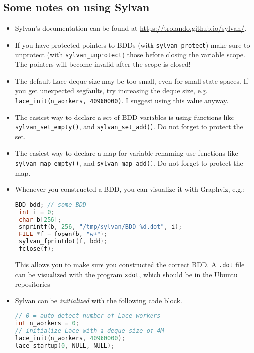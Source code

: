 \documentclass{article}
\begin{document}
\subsection{Some notes on using Sylvan}
\begin{itemize}
    \item Sylvan's documentation can be found at \url{https://trolando.github.io/sylvan/}.
    \item If you have protected pointers to BDDs (with \texttt{sylvan\_protect}) make sure to unprotect (with \texttt{sylvan\_unprotect}) those before closing the variable scope. The pointers will become invalid after the scope is closed!
    \item The default Lace deque size may be too small, even for small state spaces. If you get unexpected segfaults, try increasing the deque size, e.g. \texttt{lace\_init(n\_workers, 40960000)}. I suggest using this value anyway.
    \item The easiest way to declare a set of BDD variables is using functions like \texttt{sylvan\_set\_empty()}, and \texttt{sylvan\_set\_add()}. Do not forget to protect the set.
    \item The easiest way to declare a map for variable renaming use functions like \texttt{sylvan\_map\_empty()}, and \texttt{sylvan\_map\_add()}. Do not forget to protect the map.
    \item Whenever you constructed a BDD, you can visualize it with Graphviz, e.g.:
        \begin{lstlisting}[language=c]
 BDD bdd; // some BDD
 int i = 0;
 char b[256];
 snprintf(b, 256, "/tmp/sylvan/BDD-%d.dot", i);
 FILE *f = fopen(b, "w+");
 sylvan_fprintdot(f, bdd);
 fclose(f);
        \end{lstlisting}
        This allows you to make sure you constructed the correct BDD. A \texttt{.dot} file can be visualized with the program \texttt{xdot}, which should be in the Ubuntu repositories.
\item Sylvan can be \emph{initialized} with the following code block.
        \begin{lstlisting}[language=c]
// 0 = auto-detect number of Lace workers
int n_workers = 0;
// initialize Lace with a deque size of 4M
lace_init(n_workers, 40960000);
lace_startup(0, NULL, NULL);


\end{lstlisting}
\end{itemize}
\end{document}
